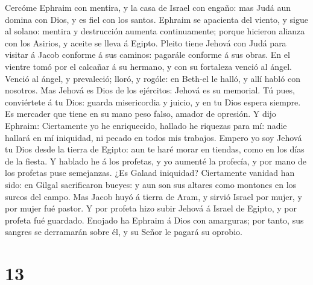 Cercóme Ephraim con mentira, y la casa de Israel con
engaño: mas Judá aun domina con Dios, y es fiel con los santos.
 Ephraim se apacienta del viento, y sigue al solano: mentira
y destrucción aumenta continuamente; porque hicieron alianza con los
Asirios, y aceite se lleva á Egipto.  Pleito tiene Jehová
con Judá para visitar á Jacob conforme á sus caminos: pagarále conforme
á sus obras.  En el vientre tomó por el calcañar á su
hermano, y con su fortaleza venció al ángel.  Venció al
ángel, y prevaleció; lloró, y rogóle: en Beth-el le halló, y allí habló
con nosotros.  Mas Jehová es Dios de los ejércitos: Jehová
es su memorial.  Tú pues, conviértete á tu Dios: guarda
misericordia y juicio, y en tu Dios espera siempre.  Es
mercader que tiene en su mano peso falso, amador de opresión.
 Y dijo Ephraim: Ciertamente yo he enriquecido, hallado he
riquezas para mí: nadie hallará en mí iniquidad, ni pecado en todos mis
trabajos.  Empero yo soy Jehová tu Dios desde la tierra de
Egipto: aun te haré morar en tiendas, como en los días de la fiesta.
 Y hablado he á los profetas, y yo aumenté la profecía, y
por mano de los profetas puse semejanzas.  ¿Es Galaad
iniquidad? Ciertamente vanidad han sido: en Gilgal sacrificaron bueyes:
y aun son sus altares como montones en los surcos del campo.
 Mas Jacob huyó á tierra de Aram, y sirvió Israel por
mujer, y por mujer fué pastor.  Y por profeta hizo subir
Jehová á Israel de Egipto, y por profeta fué guardado. Enojado ha
Ephraim á Dios con amarguras; por tanto, sus sangres se derramarán sobre
él, y su Señor le pagará su oprobio.

\hypertarget{section-12}{%
\section{13}\label{section-12}}

